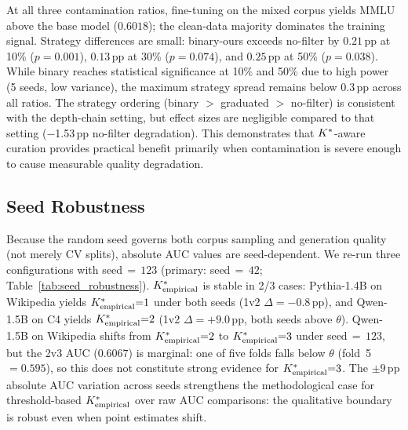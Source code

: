 \begin{table}[h]
\centering
\small
\caption{MMLU accuracy by contamination ratio (fraction of synthetic data in training set) and filtering strategy. Base model (no fine-tuning): 0.6018. Mean $\pm$ std over 5 seeds.}
\label{tab:dose_response}
\end{table}

{\sloppy At all three contamination ratios, fine-tuning on the mixed corpus yields MMLU above the base model ($0.6018$); the clean-data majority dominates the training signal.
Strategy differences are small: binary-ours exceeds no-filter by $0.21$\,pp at 10\% ($p = 0.001$), $0.13$\,pp at 30\% ($p = 0.074$), and $0.25$\,pp at 50\% ($p = 0.038$).
While binary reaches statistical significance at 10\% and 50\% due to high power (5 seeds, low variance), the maximum strategy spread remains below 0.3\,pp across all ratios.
The strategy ordering (binary $>$ graduated $>$ no-filter) is consistent with the depth-chain setting, but effect sizes are negligible compared to that setting ($-$1.53\,pp no-filter degradation).
This demonstrates that ${K^*}$-aware curation provides practical benefit primarily when contamination is severe enough to cause measurable quality degradation.\par}

\subsection{Seed Robustness}
\label{sec:seed_robustness}

Because the random seed governs both corpus sampling and generation quality (not merely CV splits), absolute AUC values are seed-dependent.
We re-run three configurations with seed$\,{=}\,123$ (primary: seed$\,{=}\,42$; Table~\ref{tab:seed_robustness}).
${K^*_{\text{empirical}}}$ is stable in 2/3 cases: Pythia-1.4B on Wikipedia yields ${K^*_{\text{empirical}}}{=}1$ under both seeds (1v2 $\Delta = -0.8$\,pp), and Qwen-1.5B on C4 yields ${K^*_{\text{empirical}}}{=}2$ (1v2 $\Delta = +9.0$\,pp, both seeds above $\theta$).
Qwen-1.5B on Wikipedia shifts from ${K^*_{\text{empirical}}}{=}2$ to ${K^*_{\text{empirical}}}{=}3$ under seed$\,{=}\,123$, but the 2v3 AUC ($0.6067$) is marginal: one of five folds falls below $\theta$ (fold~5 $= 0.595$), so this does not constitute strong evidence for ${K^*_{\text{empirical}}}{=}3$.
The ${\pm}9$\,pp absolute AUC variation across seeds strengthens the methodological case for threshold-based ${K^*_{\text{empirical}}}$ over raw AUC comparisons: the qualitative boundary is robust even when point estimates shift.

